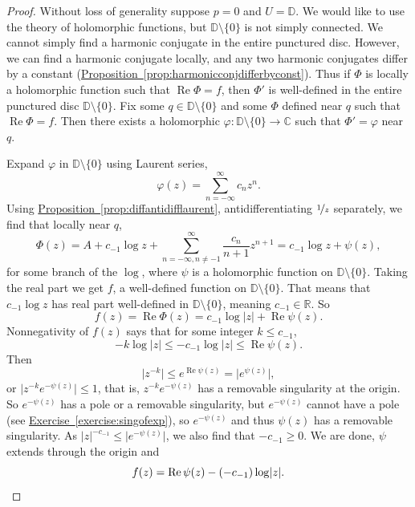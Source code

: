 \documentclass[12pt,openany]{book}
\renewcommand{\Re}{\operatorname{Re}}
\newcommand{\sabs}[1]{\lvert {#1} \rvert}
\newcommand{\babs}[1]{\bigl\lvert {#1} \bigr\rvert}
\newcommand{\C}{{\mathbb{C}}}
\newcommand{\R}{{\mathbb{R}}}
\newcommand{\D}{{\mathbb{D}}}
\theoremstyle{plain}
\theoremstyle{remark}
\theoremstyle{definition}
\theoremstyle{exercise}
\theoremstyle{example}
\newcommand{\exerciseref}[1]{\hyperref[#1]{Exercise~\ref*{#1}}}
\newcommand{\propref}[1]{\hyperref[#1]{Proposition~\ref*{#1}}}
\begin{document}
\begin{proof}
Without loss of generality suppose $p=0$ and $U = \D$.
We would like to use the theory of holomorphic functions,
but $\D \setminus \{ 0 \}$ is not simply connected.  We cannot simply find a
harmonic conjugate in the entire punctured disc.  However, we can find a harmonic
conjugate locally, and any two harmonic conjugates differ by a
constant (\propref{prop:harmonicconjdifferbyconst}).
Thus if $\Phi$ is locally a holomorphic function
such that $\Re \Phi = f$, then $\Phi'$ is well-defined in the entire
punctured disc $\D \setminus \{ 0 \}$.  Fix some $q \in \D \setminus \{ 0 \}$
and some $\Phi$ defined near $q$ such that $\Re \Phi = f$.
Then there exists a holomorphic $\varphi \colon
\D \setminus \{ 0 \} \to \C$ such that $\Phi' = \varphi$ near $q$.

Expand $\varphi$ in $\D \setminus \{ 0 \}$ using Laurent series,
\begin{equation*}
\varphi(z) = \sum_{n=-\infty}^\infty c_n {z}^n .
\end{equation*}
Using \propref{prop:diffantidifflaurent},
antidifferentiating $\nicefrac{1}{z}$ separately,
we find that locally near $q$,
\begin{equation*}
\Phi(z) =
A+
c_{-1} \log z +  
\sum_{n=-\infty,n\not=-1}^\infty \frac{c_n}{n+1} {z}^{n+1}
=
c_{-1} \log z +  
\psi(z),
\end{equation*}
for some branch of the $\log$, where $\psi$ is a holomorphic function
on $\D \setminus \{ 0 \}$.
Taking the real part we get $f$, a well-defined function on
$\D \setminus \{ 0 \}$.  That means that
$c_{-1} \log z$ has real part well-defined in $\D \setminus \{ 0 \}$,
meaning $c_{-1} \in \R$.
So
\begin{equation*}
f(z) = \Re \Phi(z) =
c_{-1} \log \sabs{z} +  
\Re \psi(z).
\end{equation*}
Nonnegativity of $f(z)$ says that
for some integer $k \leq c_{-1}$,
\begin{equation*}
-k \log \sabs{z} \leq
-c_{-1} \log \sabs{z} \leq  \Re \psi(z) .
\end{equation*}
Then
\begin{equation*}
\sabs{z^{-k}} \leq e^{\Re \psi(z)} = \babs{e^{\psi(z)}} ,
\end{equation*}
or 
$\sabs{z^{-k} e^{-\psi(z)}} \leq 1$, that is, $z^{-k} e^{-\psi(z)}$ has
a removable singularity at the origin.  So $e^{-\psi(z)}$ has
a pole or a removable singularity, but $e^{-\psi(z)}$ cannot have
a pole (see \exerciseref{exercise:singofexp}), so $e^{-\psi(z)}$
and thus $\psi(z)$ has a removable singularity.
As $\sabs{z}^{-c_{-1}} \leq \sabs{e^{-\psi(z)}}$, we also
find that $-c_{-1} \geq 0$.  We are done, $\psi$ extends through the origin
and
\begin{equation*}
f(z) = \Re \psi(z) - (-c_{-1}) \log \sabs{z} . \qedhere
\end{equation*}
\end{proof}
\end{document}

